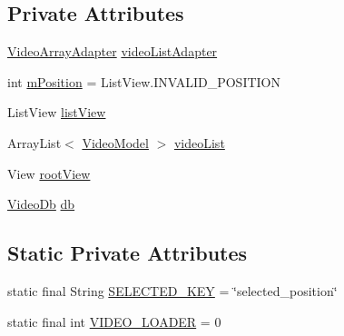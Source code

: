 \subsection*{Private Attributes}
\begin{DoxyCompactItemize}
\item 
\hyperlink{classorg_1_1buildmlearn_1_1videocollection_1_1adapter_1_1VideoArrayAdapter}{Video\+Array\+Adapter} \hyperlink{classorg_1_1buildmlearn_1_1videocollection_1_1fragment_1_1MainActivityFragment_a35180e3f8baa02ea99ed6aaf6d2f545f}{video\+List\+Adapter}
\item 
int \hyperlink{classorg_1_1buildmlearn_1_1videocollection_1_1fragment_1_1MainActivityFragment_acf0ca3d76a2b38221b66d21b16c8a289}{m\+Position} = List\+View.\+I\+N\+V\+A\+L\+I\+D\+\_\+\+P\+O\+S\+I\+T\+I\+ON
\item 
List\+View \hyperlink{classorg_1_1buildmlearn_1_1videocollection_1_1fragment_1_1MainActivityFragment_a35bc52211216ec82914530e99834aac6}{list\+View}
\item 
Array\+List$<$ \hyperlink{classorg_1_1buildmlearn_1_1videocollection_1_1data_1_1VideoModel}{Video\+Model} $>$ \hyperlink{classorg_1_1buildmlearn_1_1videocollection_1_1fragment_1_1MainActivityFragment_ad698dc8ea0500aab0936c847157d5728}{video\+List}
\item 
View \hyperlink{classorg_1_1buildmlearn_1_1videocollection_1_1fragment_1_1MainActivityFragment_af2134d930084a38c551c8a043f3340f5}{root\+View}
\item 
\hyperlink{classorg_1_1buildmlearn_1_1videocollection_1_1data_1_1VideoDb}{Video\+Db} \hyperlink{classorg_1_1buildmlearn_1_1videocollection_1_1fragment_1_1MainActivityFragment_afb865d1d85a8cf050c30d7c789ff550d}{db}
\end{DoxyCompactItemize}
\subsection*{Static Private Attributes}
\begin{DoxyCompactItemize}
\item 
static final String \hyperlink{classorg_1_1buildmlearn_1_1videocollection_1_1fragment_1_1MainActivityFragment_ae351513a6077bdd5a384457f2b62f5d0}{S\+E\+L\+E\+C\+T\+E\+D\+\_\+\+K\+EY} = \char`\"{}selected\+\_\+position\char`\"{}
\item 
static final int \hyperlink{classorg_1_1buildmlearn_1_1videocollection_1_1fragment_1_1MainActivityFragment_a52bca4b7d17915af368fa96e1a755fc3}{V\+I\+D\+E\+O\+\_\+\+L\+O\+A\+D\+ER} = 0
\end{DoxyCompactItemize}


